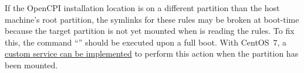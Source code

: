 If the OpenCPI installation location is on a different partition than the host machine's root partition, the symlinks for these rules may be broken at boot-time because the target partition is not yet mounted when  is reading the rules.
To fix this, the command ``'' should be executed upon a full boot.
With CentOS~7, a \href{https://askubuntu.com/a/679600/139131}{custom  service can be implemented} to perform this action when the partition has been mounted.
